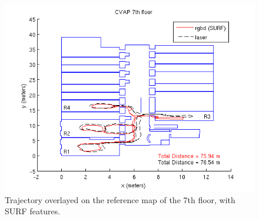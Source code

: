 \begin{figure}[H]
\centering
\includegraphics[width=1\textwidth]{figures/cvap_7th_4r_surf}
\caption{Trajectory overlayed on the reference map of the 7th floor, with SURF features.}
\end{figure}

